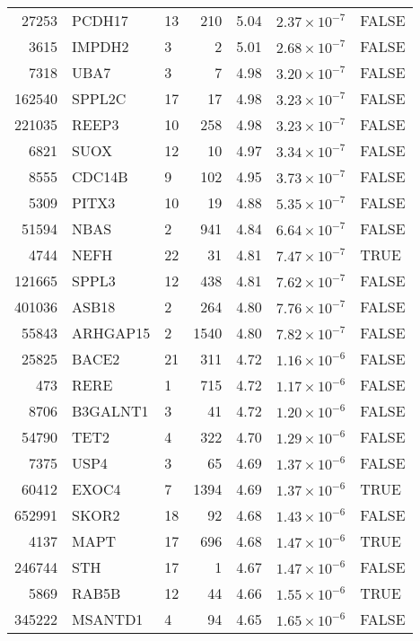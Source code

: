 \begin{table}[ht]
\begin{adjustbox}{totalheight=10in}
\begin{tabular}{rllrrrl}
  27253 & PCDH17 & 13 & 210 & 5.04 & $2.37 \times 10^{-7}$ & FALSE \\ 
  3615 & IMPDH2 & 3 &   2 & 5.01 & $2.68 \times 10^{-7}$ & FALSE \\ 
  7318 & UBA7 & 3 &   7 & 4.98 & $3.20 \times 10^{-7}$ & FALSE \\ 
  162540 & SPPL2C & 17 &  17 & 4.98 & $3.23 \times 10^{-7}$ & FALSE \\ 
  221035 & REEP3 & 10 & 258 & 4.98 & $3.23 \times 10^{-7}$ & FALSE \\ 
  6821 & SUOX & 12 &  10 & 4.97 & $3.34 \times 10^{-7}$ & FALSE \\ 
  8555 & CDC14B & 9 & 102 & 4.95 & $3.73 \times 10^{-7}$ & FALSE \\ 
  5309 & PITX3 & 10 &  19 & 4.88 & $5.35 \times 10^{-7}$ & FALSE \\ 
  51594 & NBAS & 2 & 941 & 4.84 & $6.64 \times 10^{-7}$ & FALSE \\ 
  4744 & NEFH & 22 &  31 & 4.81 & $7.47 \times 10^{-7}$ & TRUE \\ 
  121665 & SPPL3 & 12 & 438 & 4.81 & $7.62 \times 10^{-7}$ & FALSE \\ 
  401036 & ASB18 & 2 & 264 & 4.80 & $7.76 \times 10^{-7}$ & FALSE \\ 
  55843 & ARHGAP15 & 2 & 1540 & 4.80 & $7.82 \times 10^{-7}$ & FALSE \\ 
  25825 & BACE2 & 21 & 311 & 4.72 & $1.16 \times 10^{-6}$ & FALSE \\ 
  473 & RERE & 1 & 715 & 4.72 & $1.17 \times 10^{-6}$ & FALSE \\ 
  8706 & B3GALNT1 & 3 &  41 & 4.72 & $1.20 \times 10^{-6}$ & FALSE \\ 
  54790 & TET2 & 4 & 322 & 4.70 & $1.29 \times 10^{-6}$ & FALSE \\ 
  7375 & USP4 & 3 &  65 & 4.69 & $1.37 \times 10^{-6}$ & FALSE \\ 
  60412 & EXOC4 & 7 & 1394 & 4.69 & $1.37 \times 10^{-6}$ & TRUE \\ 
  652991 & SKOR2 & 18 &  92 & 4.68 & $1.43 \times 10^{-6}$ & FALSE \\ 
  4137 & MAPT & 17 & 696 & 4.68 & $1.47 \times 10^{-6}$ & TRUE \\ 
  246744 & STH & 17 &   1 & 4.67 & $1.47 \times 10^{-6}$ & FALSE \\ 
  5869 & RAB5B & 12 &  44 & 4.66 & $1.55 \times 10^{-6}$ & TRUE \\ 
  345222 & MSANTD1 & 4 &  94 & 4.65 & $1.65 \times 10^{-6}$ & FALSE \\ 

\end{tabular}
\end{adjustbox}
\end{table}
